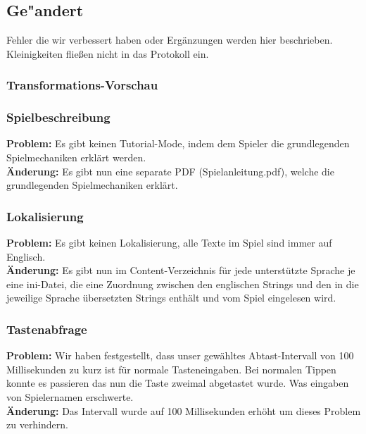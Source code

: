 %



\subsection{Ge{"a}ndert}
\label{Abschnitt:Aenderungen:Protokoll:Behobene_Probleme}

Fehler die wir verbessert haben oder Ergänzungen werden hier beschrieben. Kleinigkeiten fließen nicht in das Protokoll ein.\\











\subsubsection*{Transformations-Vorschau}








\subsubsection*{Spielbeschreibung}
\textbf{Problem:}
Es gibt keinen Tutorial-Mode, indem dem Spieler die grundlegenden Spielmechaniken erklärt werden. \\
\textbf{Änderung:} Es gibt nun eine separate PDF (\glqq Spielanleitung.pdf\grqq), welche die grundlegenden Spielmechaniken erklärt.

\subsubsection*{Lokalisierung}
\textbf{Problem:}
Es gibt keinen Lokalisierung, alle Texte im Spiel sind immer auf Englisch. \\
\textbf{Änderung:} Es gibt nun im Content-Verzeichnis für jede unterstützte Sprache je eine ini-Datei, die eine Zuordnung zwischen den englischen Strings und den in die jeweilige Sprache übersetzten Strings enthält und vom Spiel eingelesen wird.

\subsubsection*{Tastenabfrage}
\textbf{Problem:}
Wir haben festgestellt, dass unser gewähltes Abtast-Intervall von 100 Millisekunden zu kurz ist für normale Tasteneingaben. Bei normalen Tippen konnte es passieren das nun die Taste zweimal abgetastet wurde. Was eingaben von Spielernamen erschwerte. \\
\textbf{Änderung:} Das Intervall wurde auf 100 Millisekunden erhöht um dieses Problem zu verhindern.

